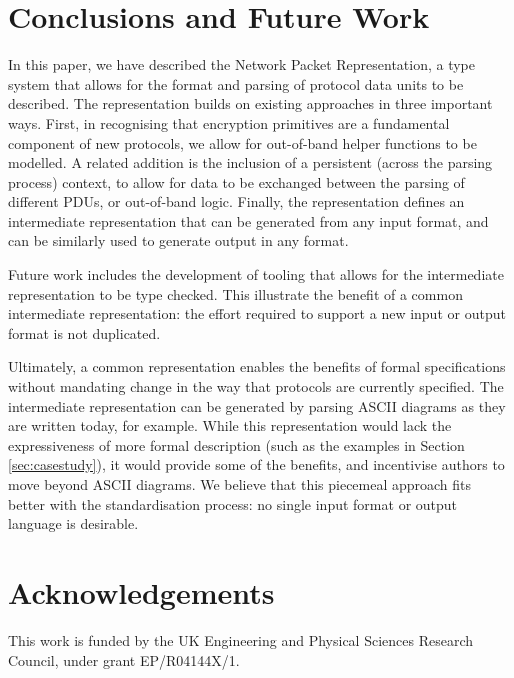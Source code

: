 \documentclass[10pt,sigconf]{acmart}
\begin{document}
\section{Conclusions and Future Work}
\label{sec:conclusion}

In this paper, we have described the Network Packet Representation, a type system that
allows for the format and parsing of protocol data units to be described. The
representation builds on existing approaches in three important ways. First, in
recognising that encryption primitives are a fundamental component of new protocols, we
allow for out-of-band helper functions to be modelled. A related addition is the inclusion
of a persistent (across the parsing process) context, to allow for data to be exchanged
between the parsing of different PDUs, or out-of-band logic. Finally, the representation
defines an intermediate representation that can be generated from any input format, and
can be similarly used to generate output in any format.

Future work includes the development of tooling that allows for the intermediate
representation to be type checked. This illustrate the benefit of a common intermediate
representation: the effort required to support a new input or output format is not
duplicated.

Ultimately, a common representation enables the benefits of formal specifications without
mandating change in the way that protocols are currently specified. The intermediate
representation can be generated by parsing ASCII diagrams as they are written today, for
example. While this representation would lack the expressiveness of more formal
description (such as the examples in Section \ref{sec:casestudy}), it would provide some
of the benefits, and incentivise authors to move beyond ASCII diagrams. We believe that
this piecemeal approach fits better with the standardisation process: no single input
format or output language is desirable.

\section*{Acknowledgements}
\footnotesize

This work is funded by the UK Engineering and Physical Sciences Research Council, under
grant EP/R04144X/1.

\balance


\end{document}
